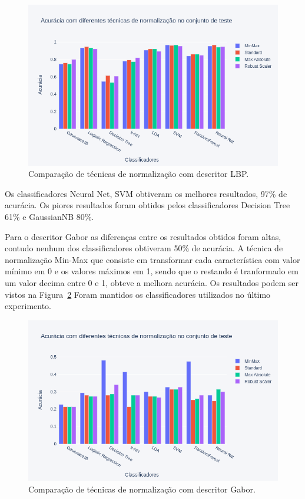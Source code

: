 \documentclass[a4paper, 12 pt, conference]{ieeeconf}  %
\begin{document}
\begin{figure}[!htbp]
	\centering
	\includegraphics[width=1.0\linewidth,clip=true,trim=0cm 0cm 0cm 0cm, keepaspectratio=true]{bar_norm_all.png}
	\caption{Comparação de técnicas de normalização com descritor LBP.}
	\label{fig:bar_norm_all}
\end{figure}

Os classificadores Neural Net, SVM obtiveram os melhores resultados, 97\% de acurácia. Os piores resultados foram obtidos pelos classificadores Decision Tree 61\% e GaussianNB 80\%.

Para o descritor Gabor as diferenças entre os resultados obtidos foram altas, contudo nenhum dos classificadores obtiveram 50\% de acurácia. A técnica de normalização Min-Max que consiste em transformar cada característica com valor mínimo em 0 e os valores máximos em 1, sendo que o restando é tranformado em um valor decima entre 0 e 1, obteve a melhora acurácia. Os resultados podem ser vistos na Figura~\ref{fig:bar_norm_all_gabor} Foram mantidos os classificadores utilizados no último experimento.

\begin{figure}[!htbp]
	\centering
	\includegraphics[width=1.0\linewidth,clip=true,trim=0cm 0cm 0cm 0cm, keepaspectratio=true]{bar_norm_all_gabor.png}
	\caption{Comparação de técnicas de normalização com descritor Gabor.}
	\label{fig:bar_norm_all_gabor}
\end{figure}
\end{document}
